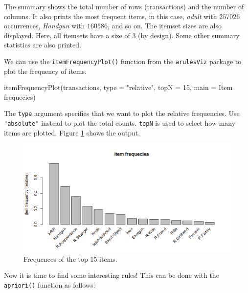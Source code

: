 \documentclass[
  11pt,
]{krantz}
\newenvironment{Shaded}{\begin{snugshade}}{\end{snugshade}}
\newcommand{\AttributeTok}[1]{\textcolor[rgb]{0.61,0.61,0.61}{#1}}
\newcommand{\DecValTok}[1]{\textcolor[rgb]{0.06,0.06,0.06}{#1}}
\newcommand{\FunctionTok}[1]{\textcolor[rgb]{0,0,0}{#1}}
\newcommand{\NormalTok}[1]{#1}
\newcommand{\StringTok}[1]{\textcolor[rgb]{0.5,0.5,0.5}{#1}}
\begin{document}
The summary shows the total number of rows (transactions) and the number of columns. It also prints the most frequent items, in this case, \emph{adult} with \(257026\) occurrences, \emph{Handgun} with \(160586\), and so on. The itemset sizes are also displayed. Here, all itemsets have a size of \(3\) (by design). Some other summary statistics are also printed.

We can use the \texttt{itemFrequencyPlot()} function from the \texttt{arulesViz} package to plot the frequency of items.

\begin{Shaded}
\begin{Highlighting}[]
\FunctionTok{itemFrequencyPlot}\NormalTok{(transactions,}
                  \AttributeTok{type =} \StringTok{"relative"}\NormalTok{,}
                  \AttributeTok{topN =} \DecValTok{15}\NormalTok{,}
                  \AttributeTok{main =} \StringTok{\textquotesingle{}Item frequecies\textquotesingle{}}\NormalTok{)}
\end{Highlighting}
\end{Shaded}

The \texttt{type} argument specifies that we want to plot the relative frequencies. Use \texttt{"absolute"} instead to plot the total counts. \texttt{topN} is used to select how many items are plotted. Figure \ref{fig:rulesfreqs} shows the output.

\begin{figure}

{\centering \includegraphics[width=1\linewidth]{images/item_freqs} 

}

\caption{Frequences of the top 15 items.}\label{fig:rulesfreqs}
\end{figure}

Now it is time to find some interesting rules! This can be done with the \texttt{apriori()} function as follows:
\end{document}
